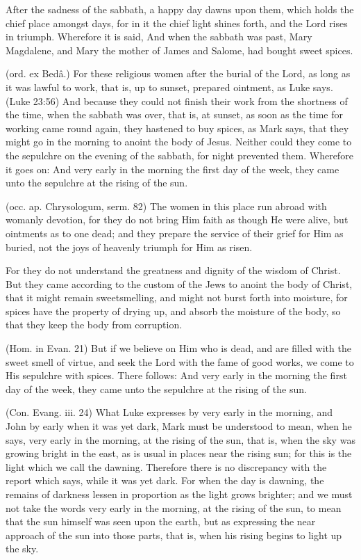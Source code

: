  After the sadness of the sabbath, a happy day dawns upon them, which holds the chief place amongst days, for in it the chief light shines forth, and the Lord rises in triumph. Wherefore it is said, And when the sabbath was past, Mary Magdalene, and Mary the mother of James and Salome, had bought sweet spices.

 (ord. ex Bedâ.) For these religious women after the burial of the Lord, as long as it was lawful to work, that is, up to sunset, prepared ointment, as Luke says. (Luke 23:56) And because they could not finish their work from the shortness of the time, when the sabbath was over, that is, at sunset, as soon as the time for working came round again, they hastened to buy spices, as Mark says, that they might go in the morning to anoint the body of Jesus. Neither could they come to the sepulchre on the evening of the sabbath, for night prevented them. Wherefore it goes on: And very early in the morning the first day of the week, they came unto the sepulchre at the rising of the sun.

 (occ. ap. Chrysologum, serm. 82) The women in this place run abroad with womanly devotion, for they do not bring Him faith as though He were alive, but ointments as to one dead; and they prepare the service of their grief for Him as buried, not the joys of heavenly triumph for Him as risen.

 For they do not understand the greatness and dignity of the wisdom of Christ. But they came according to the custom of the Jews to anoint the body of Christ, that it might remain sweetsmelling, and might not burst forth into moisture, for spices have the property of drying up, and absorb the moisture of the body, so that they keep the body from corruption.

 (Hom. in Evan. 21) But if we believe on Him who is dead, and are filled with the sweet smell of virtue, and seek the Lord with the fame of good works, we come to His sepulchre with spices. There follows: And very early in the morning the first day of the week, they came unto the sepulchre at the rising of the sun.

 (Con. Evang. iii. 24) What Luke expresses by very early in the morning, and John by early when it was yet dark, Mark must be understood to mean, when he says, very early in the morning, at the rising of the sun, that is, when the sky was growing bright in the east, as is usual in places near the rising sun; for this is the light which we call the dawning. Therefore there is no discrepancy with the report which says, while it was yet dark. For when the day is dawning, the remains of darkness lessen in proportion as the light grows brighter; and we must not take the words very early in the morning, at the rising of the sun, to mean that the sun himself was seen upon the earth, but as expressing the near approach of the sun into those parts, that is, when his rising begins to light up the sky.

